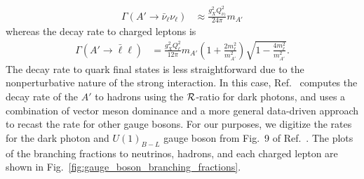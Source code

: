 \begin{align}
    \Gamma(A' \rightarrow \bar{\nu}_\ell\nu_\ell) &\approx \frac{g_X^2Q_{\nu_\ell}^2}{24\pi}m_{A'}
\end{align}
whereas the decay rate to charged leptons is
\begin{align}
    \Gamma(A' \rightarrow \bar{\ell}\ell) &= \frac{g_X^2Q_\ell^2}{12\pi}m_{A'}\left(1+\frac{2m_\ell^2}{m_{A'}^2}\right)\sqrt{1-\frac{4m_\ell^2}{m_{A'}^2}}.
\end{align}
 The decay rate to quark final states is less straightforward due to the nonperturbative nature of the strong interaction. In this case, Ref.~\cite{Ilten:2018crw} computes the decay rate of the $A'$ to hadrons using the ${\cal R}$-ratio for dark photons, and uses a combination of vector meson dominance and a more general data-driven approach to recast the rate for other gauge bosons. For our purposes, we digitize the rates for the dark photon and $U(1)_{B-L}$ gauge boson from Fig.~9 of Ref.~\cite{Ilten:2018crw}. 
The plots of the branching fractions to neutrinos, hadrons, and each charged lepton are shown in Fig.~\ref{fig:gauge_boson_branching_fractions}.

